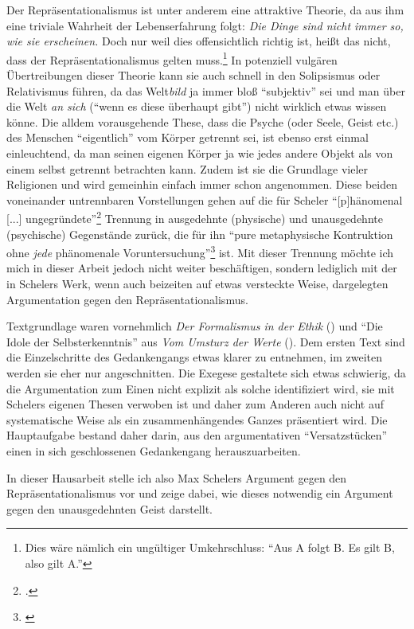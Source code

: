 \documentclass[a4paper, 12pt]{article}
\begin{document}
\begin{onehalfspace}
Der Repräsentationalismus ist unter anderem eine attraktive Theorie, da aus ihm eine triviale Wahrheit der Lebenserfahrung folgt: \emph{Die Dinge sind nicht immer so, wie sie erscheinen.} Doch nur weil dies offensichtlich richtig ist, heißt das nicht, dass der Repräsentationalismus gelten muss.\footnote{Dies wäre nämlich ein ungültiger Umkehrschluss: "`Aus A folgt B. Es gilt B, also gilt A."'} In potenziell vulgären Übertreibungen dieser Theorie kann sie auch schnell in den Solipsismus oder Relativismus führen, da das Welt\emph{bild} ja immer bloß "`subjektiv"' sei und man über die Welt \emph{an sich} ("`wenn es diese überhaupt gibt"') nicht wirklich etwas wissen könne. Die alldem vorausgehende These, dass die Psyche (oder Seele, Geist etc.) des Menschen "`eigentlich"' vom Körper getrennt sei, ist ebenso erst einmal einleuchtend, da man seinen eigenen Körper ja wie jedes andere Objekt als von einem selbst getrennt betrachten kann. Zudem ist sie die Grundlage vieler Religionen und wird gemeinhin einfach immer schon angenommen. Diese beiden voneinander untrennbaren Vorstellungen gehen auf die für Scheler "`[p]hänomenal [...] ungegründete"'\footnote{\Cite[Siehe][S. 229]{scheler-idole}.} Trennung in ausgedehnte (physische) und unausgedehnte (psychische) Gegenstände zurück, die für ihn "`pure metaphysische Kontruktion ohne \emph{jede} phänomenale Voruntersuchung"'\footnote{\Cite[Siehe][S. 229]{scheler-idole}} ist. Mit dieser Trennung möchte ich mich in dieser Arbeit jedoch nicht weiter beschäftigen, sondern lediglich mit der in Schelers Werk, wenn auch beizeiten auf etwas versteckte Weise, dargelegten Argumentation gegen den Repräsentationalismus. 

Textgrundlage waren vornehmlich  \emph{Der Formalismus in der Ethik} (\citet{scheler-ethik}) und "`Die Idole der Selbsterkenntnis"' aus \emph{Vom Umsturz der Werte} (\cite{scheler-idole}). Dem ersten Text sind die Einzelschritte des Gedankengangs etwas klarer zu entnehmen, im zweiten werden sie eher nur angeschnitten. Die Exegese gestaltete sich etwas schwierig, da die Argumentation zum Einen nicht explizit als solche identifiziert wird, sie mit Schelers eigenen Thesen verwoben ist und daher zum Anderen auch nicht auf systematische Weise als ein zusammenhängendes Ganzes präsentiert wird. Die Hauptaufgabe bestand daher darin, aus den argumentativen "`Versatzstücken"' einen in sich geschlossenen Gedankengang herauszuarbeiten. 

In dieser Hausarbeit stelle ich also Max Schelers Argument gegen den Repräsen\-tatio\-na\-lismus vor und zeige dabei, wie dieses notwendig ein Argument gegen den unausgedehnten Geist darstellt. 


\end{onehalfspace}
\end{document}
